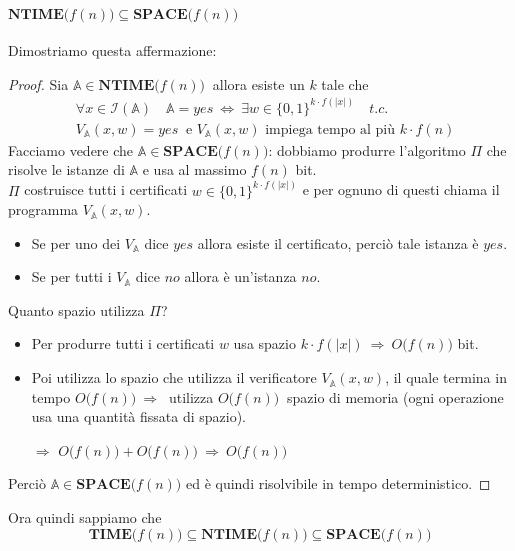 \documentclass[a4paper]{article}
\theoremstyle{definition}
\newcommand{\ntime}{\mathbf{NTIME}}
\newcommand{\Space}{\mathbf{SPACE}}
\newcommand{\prob}[1]{\mathbb{#1}}
\newcommand{\instance}[1]{\mathcal{I}(\prob{#1})}
\begin{document}
			\paragraph{$ \ntime\big(f(n)\big) \subseteq \Space\big(f(n)\big) $} Dimostriamo questa affermazione:
			\begin{proof}
				
				Sia $ \prob{A} \in \ntime\big(f(n)\big) \ $ allora esiste un $ k $ tale che 
				\begin{align*}
					&\forall x \in \instance{A} \quad \prob{A} = yes\ \Leftrightarrow \ \exists w \in \{0, 1\}^{k\cdot f(|x|)} \quad t.c. \\ 
					&V_{\prob{A}}(x, w) = yes\ \text{ e } V_{\prob{A}}(x, w) \text{ impiega tempo al più } k\cdot f(n)
				\end{align*}
				Facciamo vedere che $ \prob{A} \in \Space\big(f(n)\big) $: dobbiamo produrre l'algoritmo $ \Pi $ che risolve le istanze di $ \prob{A} $ e usa al massimo $ f(n) $ bit.\\
				$ \Pi $ costruisce tutti i certificati $ w \in \{0, 1\}^{k\cdot f(|x|)} $ e per ognuno di questi chiama il programma $ V_{\prob{A}}(x, w) $. 
				\begin{itemize}
					\item Se per uno dei $ V_{\prob{A}} $ dice $ yes $ allora esiste il certificato, perciò tale istanza è $ yes $.
					\item Se per tutti i $ V_{\prob{A}} $ dice $ no $ allora è un'istanza $ no $.
				\end{itemize}
				Quanto spazio utilizza $ \Pi $?
				\begin{itemize}
					\item Per produrre tutti i certificati $ w $ usa spazio $ k\cdot f(|x|)\ \Rightarrow\ O\big(f(n)\big) $ bit.
					\item Poi utilizza lo spazio che utilizza il verificatore $ V_{\prob{A}}(x, w) $, il quale termina in tempo $ O\big(f(n)\big)\ \Rightarrow\  $ utilizza $ O\big(f(n)\big)\ $ spazio di memoria (ogni operazione usa una quantità fissata di spazio).
					\item[$ \Rightarrow $] $ O\big(f(n)\big) + O\big(f(n)\big) \ \Rightarrow\ O\big(f(n)\big) $
				\end{itemize}
				Perciò $ \prob{A} \in \Space\big(f(n)\big) $ ed è quindi risolvibile in tempo deterministico.
			\end{proof}
			
			Ora quindi sappiamo che
			\[
				\mathbf{TIME}\big(f(n)\big) \subseteq \ntime\big(f(n)\big) \subseteq \Space\big(f(n)\big)
			\]
			
\end{document}
